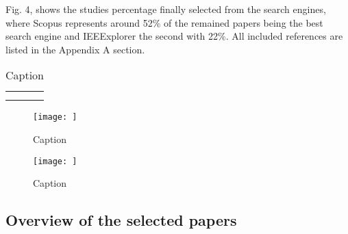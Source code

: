 \documentclass[peerreview]{IEEEtran}
\begin{document}
Fig. 4, shows the studies percentage finally selected from the search engines, where Scopus represents around 52\% of the remained papers being the best search engine and IEEExplorer the second with 22\%. 
All included references are listed in the Appendix A section.


\begin{table}[]
    \centering
    \begin{tabular}{c|c}
         &  \\
         & 
    \end{tabular}
    \caption{Caption}
    \label{tab:my_label}
\end{table}


\begin{figure}
    \centering
    \texttt{[image: ]}
    \caption{Caption}
    \label{fig:my_label}
\end{figure}

\begin{figure}
    \centering
    \texttt{[image: ]}
    \caption{Caption}
    \label{fig:my_label}
\end{figure}



\subsection{Overview of the selected papers}




%
%
\end{document}
